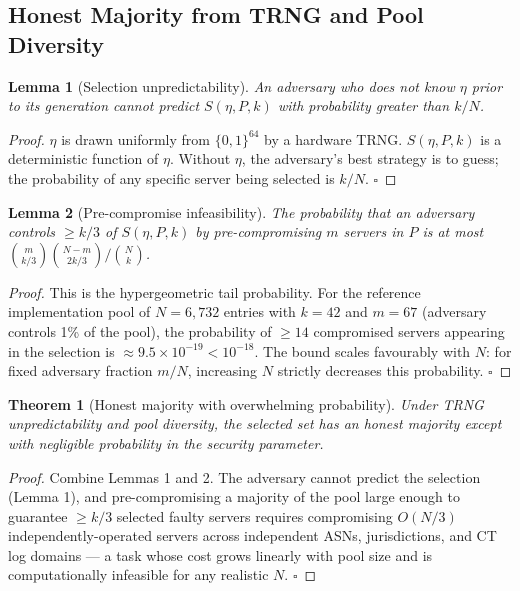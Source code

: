\documentclass[11pt,twocolumn]{article}
\newtheorem{theorem}{Theorem}
\newtheorem{lemma}{Lemma}
\begin{document}
\subsection{Honest Majority from TRNG and Pool Diversity}

\begin{lemma}[Selection unpredictability]
  An adversary who does not know $\eta$ prior to its generation cannot
  predict $S(\eta, P, k)$ with probability greater than $k/N$.
\end{lemma}

\begin{proof}
  $\eta$ is drawn uniformly from $\{0,1\}^{64}$ by a hardware TRNG.
  $S(\eta, P, k)$ is a deterministic function of $\eta$.  Without $\eta$,
  the adversary's best strategy is to guess; the probability of any specific
  server being selected is $k/N$.  $\square$
\end{proof}

\begin{lemma}[Pre-compromise infeasibility]
  The probability that an adversary controls $\geq k/3$ of $S(\eta, P, k)$
  by pre-compromising $m$ servers in $P$ is at most
  $\binom{m}{k/3}\binom{N-m}{2k/3} / \binom{N}{k}$.
\end{lemma}

\begin{proof}
  This is the hypergeometric tail probability.  For the reference implementation
  pool of $N = 6{,}732$ entries with $k = 42$ and $m = 67$ (adversary controls
  1\% of the pool), the probability of $\geq 14$ compromised servers appearing
  in the selection is $\approx 9.5 \times 10^{-19} < 10^{-18}$.  The bound
  scales favourably with $N$: for fixed adversary fraction $m/N$, increasing
  $N$ strictly decreases this probability.  $\square$
\end{proof}

\begin{theorem}[Honest majority with overwhelming probability]
  Under TRNG unpredictability and pool diversity, the selected set has an
  honest majority except with negligible probability in the security parameter.
\end{theorem}

\begin{proof}
  Combine Lemmas 1 and 2.  The adversary cannot predict the selection
  (Lemma 1), and pre-compromising a majority of the pool large enough to
  guarantee $\geq k/3$ selected faulty servers requires compromising $O(N/3)$
  independently-operated servers across independent ASNs, jurisdictions, and
  CT log domains — a task whose cost grows linearly with pool size and is
  computationally infeasible for any realistic $N$.  $\square$
\end{proof}
\end{document}
